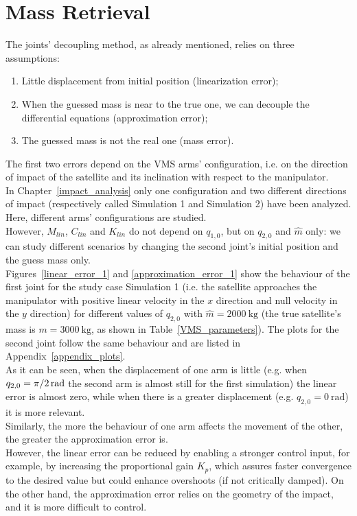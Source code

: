 \documentclass[a4paper,12pt,oneside]{report}
\begin{document}
\section{Mass Retrieval}\label{mass_retrieval}
The joints' decoupling method, as already mentioned, relies on three assumptions:
\begin{enumerate}
  \item Little displacement from initial position (linearization error);
  \item When the guessed mass is near to the true one, we can decouple the differential equations (approximation error);
  \item The guessed mass is not the real one (mass error).
\end{enumerate}
The first two errors depend on the VMS arms' configuration, i.e. on the direction of impact of the satellite and its inclination with respect to the manipulator.\\
In Chapter~\ref{impact_analysis} only one configuration and two different directions of impact (respectively called Simulation 1 and Simulation 2) have been analyzed. Here, different arms' configurations are studied.\\
However, $M_{lin}$, $C_{lin}$ and $K_{lin}$ do not depend on $q_{1,0}$, but on $q_{2,0}$ and $\hat{m}$ only: we can study different scenarios by changing the second joint's initial position and the guess mass only.\\
Figures~\ref{linear_error_1} and \ref{approximation_error_1} show the behaviour of the first joint for the study case Simulation 1 (i.e. the satellite approaches the manipulator with positive linear velocity in the $x$ direction and null velocity in the $y$ direction) for different values of $q_{2,0}$ with $\hat{m}=\SI{2000}{\kilogram}$ (the true satellite's mass is $m=\SI{3000}{\kilogram}$, as shown in Table~\ref{VMS_parameters}). The plots for the second joint follow the same behaviour and are listed in Appendix~\ref{appendix_plots}.\\
As it can be seen, when the displacement of one arm is little (e.g. when $q_{2,0}=\SI[parse-numbers = false]{\pi/2}{\radian}$ the second arm is almost still for the first simulation) the linear error is almost zero, while when there is a greater displacement (e.g. $q_{2,0}=\SI{0}{\radian}$) it is more relevant.\\
Similarly, the more the behaviour of one arm affects the movement of the other, the greater the approximation error is.\\
However, the linear error can be reduced by enabling a stronger control input, for example, by increasing the proportional gain $K_p$, which assures faster convergence to the desired value but could enhance overshoots (if not critically damped). On the other hand, the approximation error relies on the geometry of the impact, and it is more difficult to control.\\
\end{document}
